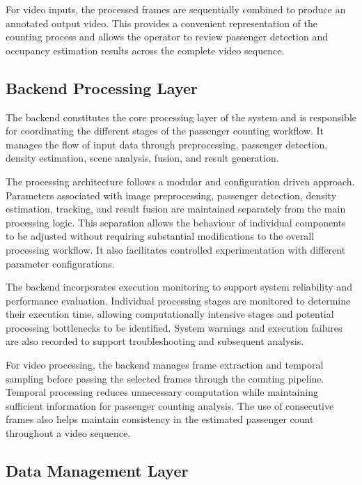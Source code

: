 For video inputs, the processed frames are sequentially combined to produce an annotated output video. This provides a convenient representation of the counting process and allows the operator to review passenger detection and occupancy estimation results across the complete video sequence.

\subsection{Backend Processing Layer}

The backend constitutes the core processing layer of the system and is responsible for coordinating the different stages of the passenger counting workflow. It manages the flow of input data through preprocessing, passenger detection, density estimation, scene analysis, fusion, and result generation.

The processing architecture follows a modular and configuration driven approach. Parameters associated with image preprocessing, passenger detection, density estimation, tracking, and result fusion are maintained separately from the main processing logic. This separation allows the behaviour of individual components to be adjusted without requiring substantial modifications to the overall processing workflow. It also facilitates controlled experimentation with different parameter configurations.

The backend incorporates execution monitoring to support system reliability and performance evaluation. Individual processing stages are monitored to determine their execution time, allowing computationally intensive stages and potential processing bottlenecks to be identified. System warnings and execution failures are also recorded to support troubleshooting and subsequent analysis.

For video processing, the backend manages frame extraction and temporal sampling before passing the selected frames through the counting pipeline. Temporal processing reduces unnecessary computation while maintaining sufficient information for passenger counting analysis. The use of consecutive frames also helps maintain consistency in the estimated passenger count throughout a video sequence.

\subsection{Data Management Layer}


